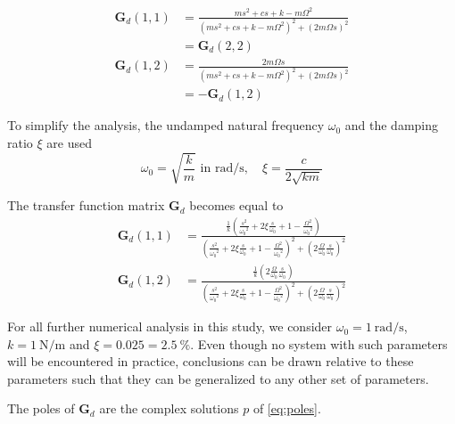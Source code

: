 \documentclass[10pt]{iopart}
\begin{document}
\begin{subequations}
\begin{align}
  \mathbf{G}_{d}(1,1) &= {\frac{ms^2 + cs + k - m \Omega^2}{\left( m s^2 + cs + k - m \Omega^2 \right)^2 + \left( 2 m \Omega s \right)^2}} \\
                  &= \mathbf{G}_{d}(2,2) \nonumber \\
  \mathbf{G}_{d}(1,2) &= {\frac{2 m \Omega s}{\left( m s^2 + cs + k - m \Omega^2 \right)^2 + \left( 2 m \Omega s \right)^2}} \\
                  &= -\mathbf{G}_{d}(1,2) \nonumber
\end{align}
\end{subequations}

To simplify the analysis, the undamped natural frequency \(\omega_0\) and the damping ratio \(\xi\) are used
\begin{equation}
  \omega_0 = \sqrt{\frac{k}{m}} \text{ in } \si{\radian\per\second}, \quad \xi = \frac{c}{2 \sqrt{k m}}
\end{equation}

The transfer function matrix \(\mathbf{G}_d\) becomes equal to
\begin{subequations}
\label{eq:Gd_w0_xi_k}
  \begin{align}
    \mathbf{G}_{d}(1,1) &= {\scriptstyle \frac{\frac{1}{k} \left( \frac{s^2}{{\omega_0}^2} + 2 \xi \frac{s}{\omega_0} + 1 - \frac{{\Omega}^2}{{\omega_0}^2} \right)}{\left( \frac{s^2}{{\omega_0}^2} + 2 \xi \frac{s}{\omega_0} + 1 - \frac{{\Omega}^2}{{\omega_0}^2} \right)^2 + \left( 2 \frac{\Omega}{\omega_0} \frac{s}{\omega_0} \right)^2} } \\
    \mathbf{G}_{d}(1,2) &= {\scriptstyle \frac{\frac{1}{k} \left( 2 \frac{\Omega}{\omega_0} \frac{s}{\omega_0} \right)}{\left( \frac{s^2}{{\omega_0}^2} + 2 \xi \frac{s}{\omega_0} + 1 - \frac{{\Omega}^2}{{\omega_0}^2} \right)^2 + \left( 2 \frac{\Omega}{\omega_0} \frac{s}{\omega_0} \right)^2} }
  \end{align}
\end{subequations}

For all further numerical analysis in this study, we consider \(\omega_0 = \SI{1}{\radian\per\second}\), \(k = \SI{1}{\newton\per\meter}\) and \(\xi = 0.025 = \SI{2.5}{\percent}\).
Even though no system with such parameters will be encountered in practice, conclusions can be drawn relative to these parameters such that they can be generalized to any other set of parameters.

\par
The poles of \(\mathbf{G}_d\) are the complex solutions \(p\) of \eqref{eq:poles}.
\end{document}
